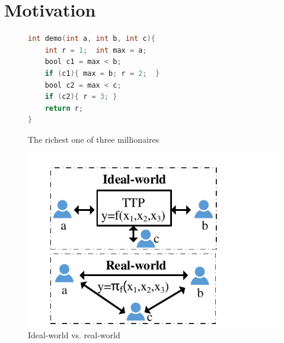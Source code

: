 \section{Motivation}\label{sec:motivation}

\begin{figure}[t]\centering
\begin{minipage}{0.55\textwidth}
  \centering
  \lstset{style=mystyle}
\begin{lstlisting}[language=C]
int demo(int a, int b, int c){
    int r = 1;  int max = a;
    bool c1 = max < b;
    if (c1){ max = b; r = 2;  }
    bool c2 = max < c;
    if (c2){ r = 3; }
    return r;
}
\end{lstlisting}\vspace*{-3mm}
\caption{The richest one of three millionaires}
\label{fig:motivation}
\end{minipage}
\hfill
\begin{minipage}{0.4\textwidth}
  \centering
	\includegraphics[scale=0.55]{img/ideal-real-v2}
     \caption{Ideal-world vs. real-world}
	\label{fig:ideal-real}
\end{minipage}
\end{figure}
%

